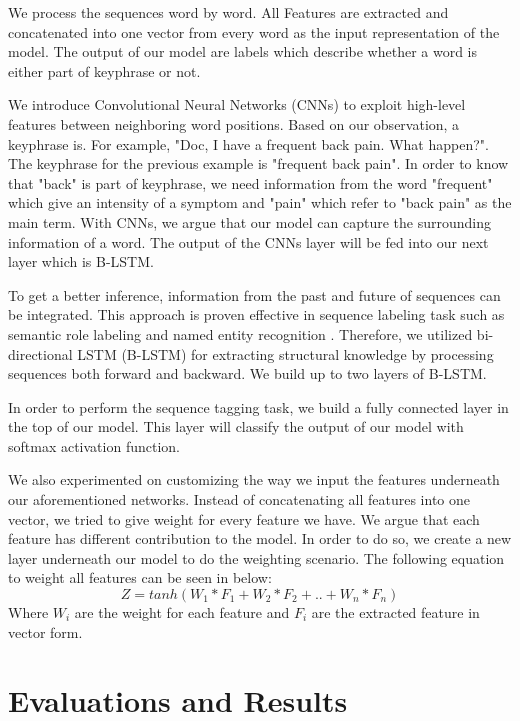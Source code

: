 We process the sequences word by word. All Features are extracted and concatenated into one vector from every word as the input representation of the model. The output of our model are labels which describe whether a word is either part of keyphrase or not. 

We introduce Convolutional Neural Networks (CNNs) to exploit high-level features between neighboring word positions. Based on our observation, a keyphrase is. For example, "Doc, I have a frequent back pain. What happen?". The keyphrase for the previous example is "frequent back pain". In order to know that "back" is part of keyphrase, we need information from the word "frequent" which give an intensity of a symptom and "pain" which refer to "back pain" as the main term. With CNNs, we argue that our model can capture the surrounding information of a word. The output of the CNNs layer will be fed into our next layer which is B-LSTM.

To get a better inference, information from the past and future of sequences can be integrated. This approach is proven effective in sequence labeling task such as semantic role labeling \cite{SMRzhou2015end} and named entity recognition \cite{ma2016end}. Therefore, we utilized bi-directional LSTM (B-LSTM) for extracting structural knowledge by processing sequences both forward and backward. We build up to two layers of B-LSTM.

In order to perform the sequence tagging task, we build a fully connected layer in the top of our model. This layer will classify the output of our model with softmax activation function.

We also experimented on customizing the way we input the features underneath our aforementioned networks. Instead of concatenating all features into one vector, we tried to give weight for every feature we have. We argue that each feature has different contribution to the model. In order to do so, we create a new layer underneath our model to do the weighting scenario. The following equation to weight all features can be seen in below:
\begin{equation}
Z =  tanh(W _{1}*F_{1} + W_{2}*F_{2} + .. + W_{n}*F_{n})
\end{equation}
Where $W_{i}$ are the weight for each feature and $F_{i}$ are the extracted feature in vector form.

\section{Evaluations and Results}
